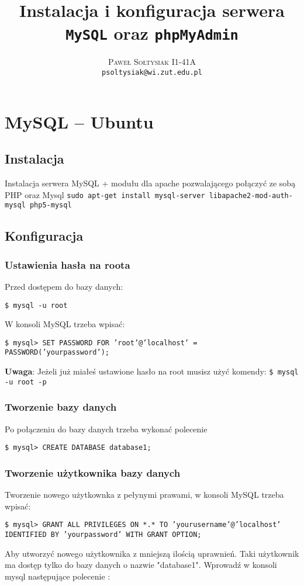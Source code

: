 \documentclass{article}
\title{Instalacja i konfiguracja serwera \texttt{MySQL} oraz \texttt{phpMyAdmin}}
\author{\textsc{Paweł Sołtysiak I1-41A} \\ \texttt{psoltysiak@wi.zut.edu.pl}}
\begin{document}
\maketitle

\section{MySQL -- Ubuntu}
\subsection{Instalacja}
Instalacja serwera MySQL + modułu dla apache pozwalającego połączyć ze sobą PHP oraz Mysql
\texttt{sudo apt-get install mysql-server libapache2-mod-auth-mysql php5-mysql}
\subsection{Konfiguracja}
\subsubsection{Ustawienia hasła na roota}
Przed dostępem do bazy danych:

\texttt{\$ mysql -u root}

W konsoli MySQL trzeba wpisać:

\texttt{\$ mysql> SET PASSWORD FOR 'root'@'localhost' = PASSWORD('yourpassword');}

\textbf{Uwaga}: Jeżeli już miałeś ustawione hasło na root musisz użyć komendy:
\texttt{\$ mysql -u root -p}


\subsubsection{Tworzenie bazy danych}
Po połączeniu do bazy danych trzeba wykonać polecenie

\texttt{\$ mysql> CREATE DATABASE database1;}

\subsubsection{Tworzenie użytkownika bazy danych}

Tworzenie nowego użytkownka z pełynymi prawami, w konsoli MySQL trzeba wpisać:

\texttt{\$ mysql> GRANT ALL PRIVILEGES ON *.* TO 'yourusername'@'localhost' IDENTIFIED BY 'yourpassword' WITH GRANT OPTION;}

Aby utworzyć nowego użytkownika z mniejszą ilością uprawnień. Taki użytkownik ma dostęp tylko do bazy danych o nazwie "database1". Wprowadź w konsoli mysql następujące polecenie :
\end{document}

